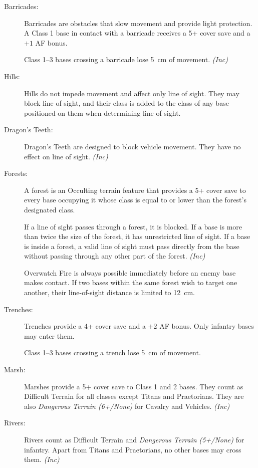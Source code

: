 \begin{description}
    \item[Barricades:] Barricades are obstacles that slow movement and provide light protection. A Class 1 base in contact with a barricade receives a 5+ cover save and a $+1$ AF bonus.

    Class 1--3 bases crossing a barricade lose 5~cm of movement. \textit{(Inc)}

    \item[Hills:] Hills do not impede movement and affect only line of sight. They may block line of sight, and their class is added to the class of any base positioned on them when determining line of sight.

    \item[Dragon's Teeth:] Dragon's Teeth are designed to block vehicle movement. They have no effect on line of sight. \textit{(Inc)}

    \item[Forests:] A forest is an Occulting terrain feature that provides a 5+ cover save to every base occupying it whose class is equal to or lower than the forest's designated class.

    If a line of sight passes through a forest, it is blocked. If a base is more than twice the size of the forest, it has unrestricted line of sight. If a base is inside a forest, a valid line of sight must pass directly from the base without passing through any other part of the forest. \textit{(Inc)}

    Overwatch Fire is always possible immediately before an enemy base makes contact. If two bases within the same forest wish to target one another, their line-of-sight distance is limited to 12~cm.

    \item[Trenches:] Trenches provide a 4+ cover save and a $+2$ AF bonus. Only infantry bases may enter them.

    Class 1--3 bases crossing a trench lose 5~cm of movement.

    \item[Marsh:] Marshes provide a 5+ cover save to Class 1 and 2 bases. They count as Difficult Terrain for all classes except Titans and Praetorians. They are also \textit{Dangerous Terrain (6+/None)} for Cavalry and Vehicles. \textit{(Inc)}

    \item[Rivers:] Rivers count as Difficult Terrain and \textit{Dangerous Terrain (5+/None)} for infantry. Apart from Titans and Praetorians, no other bases may cross them. \textit{(Inc)}


\end{description}
